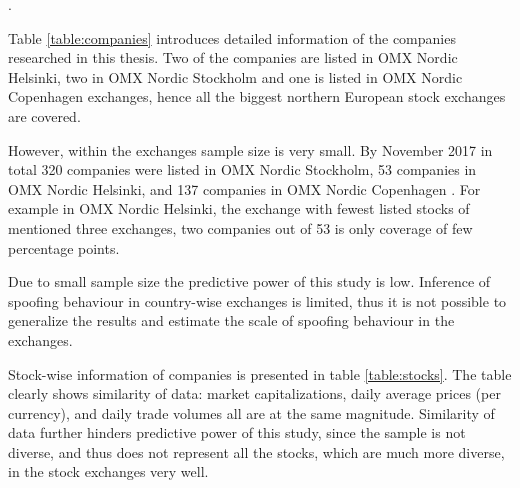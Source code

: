 \documentclass{tut-thesis}
\begin{document}
.

Table \ref{table:companies} introduces detailed information of the companies researched in this thesis. Two of the companies are listed in OMX Nordic Helsinki, two in OMX Nordic Stockholm and one is listed in OMX Nordic Copenhagen exchanges, hence all the biggest northern European stock exchanges are covered.

However, within the exchanges sample size is very small. By November 2017 in total 320 companies were listed in OMX Nordic Stockholm, 53 companies in OMX Nordic Helsinki, and 137 companies in OMX Nordic Copenhagen \autocite{GlobeNewswire2018b}. For example in OMX Nordic Helsinki, the exchange with fewest listed stocks of mentioned three exchanges, two companies out of 53 is only coverage of few percentage points.

Due to small sample size the predictive power of this study is low. Inference of spoofing behaviour in country-wise exchanges is limited, thus it is not possible to generalize the results and estimate the scale of spoofing behaviour in the exchanges. 


Stock-wise information of companies is presented in table \ref{table:stocks}. The table clearly shows similarity of data: market capitalizations, daily average prices (per currency), and daily trade volumes all are at the same magnitude. Similarity of data further hinders predictive power of this study, since the sample is not diverse, and thus does not represent all the stocks, which are much more diverse, in the stock exchanges very well.
\end{document}

